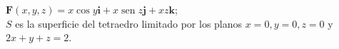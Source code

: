 \item $\mathbf{F}(x, y, z) = x \cos y\mathbf{i} + x \operatorname{sen} z\mathbf{j} + xz\mathbf{k}$;\\
    $S$ es la superficie del tetraedro limitado por los planos $x = 0, y = 0, z = 0$ y $2x + y + z = 2$.
